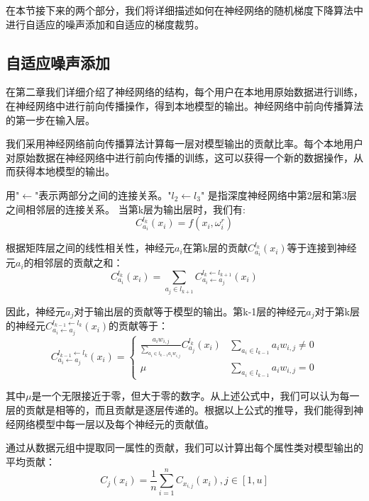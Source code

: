 在本节接下来的两个部分，我们将详细描述如何在神经网络的随机梯度下降算法中进行自适应的噪声添加和自适应的梯度裁剪。

\subsection{自适应噪声添加}
在第二章我们详细介绍了神经网络的结构，每个用户在本地用原始数据进行训练，在神经网络中进行前向传播操作，得到本地模型的输出。神经网络中前向传播算法的第一步在输入层。

我们采用神经网络前向传播算法计算每一层对模型输出的贡献比率。每个本地用户对原始数据在神经网络中进行前向传播的训练，这可以获得一个新的数据操作，从而获得本地模型的输出。

用"$\leftarrow$"表示两部分之间的连接关系。"$l_{2} \leftarrow l_{3}$" 是指深度神经网络中第2层和第3层之间相邻层的连接关系。
当第k层为输出层时，我们有:
\begin{equation}
C_{a_{i}}^{l_{k}}\left(x_{i}\right)=f\left(x_{i}, \omega_{i}^{r}\right)
\end{equation}

根据矩阵层之间的线性相关性，神经元$a_{i}$在第k层的贡献$C_{a_{i}}^{l_{k}}\left(x_{i}\right)$等于连接到神经元$a_{i}$的相邻层的贡献之和：
\begin{equation}\label{eq:层间传播1}
C_{a_{i}}^{l_{k}}\left(x_{i}\right)=\sum_{a_{j} \in l_{k+1}} C_{a_{i} \leftarrow a_{j}}^{l_{k} \leftarrow l_{k+1}}\left(x_{i}\right)
\end{equation}

因此，神经元$a_{j}$对于输出层的贡献等于模型的输出。第k-1层的神经元$a_{j}$对于第k层的神经元$C_{a_{i} \leftarrow a_{j}}^{l_{k-1} \leftarrow l_{k}}\left(x_{i}\right)$的贡献等于：
\begin{equation}
C_{a_{i} \leftarrow a_{j}}^{l_{k-1} \leftarrow l_{k}}\left(x_{i}\right)=\left\{\begin{array}{cc}\frac{a_{i} w_{i, j}}{\sum_{a_{i} \in l_{k-1} a_{i} w_{i, j}}} C_{a_{j}}^{l_{k}}\left(x_{i}\right) & \sum_{a_{i} \in l_{k-1}} a_{i} w_{i, j} \neq 0 \\ \mu & \sum_{a_{i} \in l_{k-1}} a_{i} w_{i, j}=0\end{array}\right.
\end{equation}

其中$\mu$是一个无限接近于零，但大于零的数字。从上述公式中，我们可以认为每一层的贡献是相等的，而且贡献是逐层传递的。根据以上公式的推导，我们能得到神经网络模型中每一层以及每个神经元的贡献值。

通过从数据元组中提取同一属性的贡献，我们可以计算出每个属性类对模型输出的平均贡献：
\begin{equation}\label{eq:属性添加自适应扰动}
C_{j}\left(x_{i}\right)=\frac{1}{n} \sum_{i=1}^{n} C_{x_{i, j}}\left(x_{i}\right), j \in[1, u]
\end{equation}

